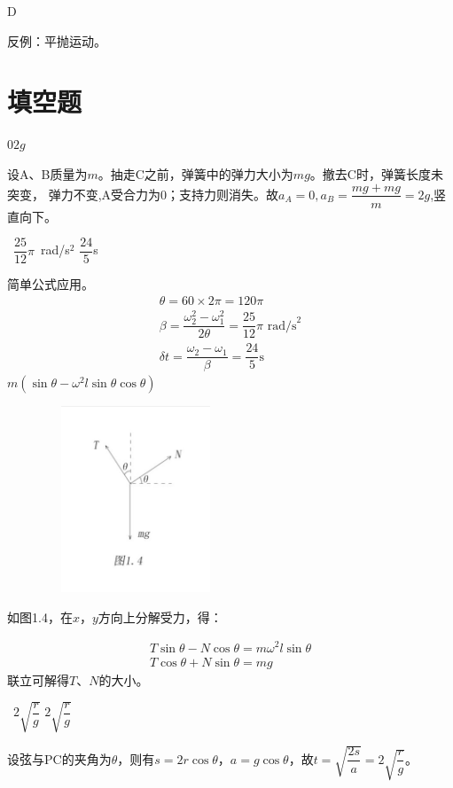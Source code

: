 \documentclass[b5paper,opensource,sourcefont,parskip]{qyxf-book}
\begin{document}
D

\solve 反例：平抛运动。

\section{填空题}
$0$\qquad$2g$

\solve 设A、B质量为$m$。抽走C之前，弹簧中的弹力大小为$mg$。撤去C时，弹簧长度未突变，
弹力不变,A受合力为0；支持力则消失。故$a_A=0,a_B=\dfrac{mg+mg}{m}=2g$,竖直向下。

\ $\dfrac{25}{12}\pi$\ rad/s${}^2$ \qquad$\dfrac{24}{5}$s

\solve 简单公式应用。
\begin{gather*}
\theta=60\times2\pi=120\pi\\
\beta=\dfrac{\omega_2^2-\omega_1^2}{2\theta}=\dfrac{25}{12}\pi\text{\ rad/s}^2\\
\delta t=\dfrac{\omega_2-\omega_1}{\beta}=\dfrac{24}{5}\mathrm{s}
\end{gather*}
$m(\sin\theta-\omega^2l\sin\theta\cos\theta)$

\begin{figure}[!htbp]
	\centering
	\includegraphics[width=15em, height=15em]{Chp1_illus4.png}
	\label{fig:c1}
\end{figure}

\solve 如图1.4，在$x$，$y$方向上分解受力，得：

\begin{gather*}
T\sin\theta-N\cos\theta=m\omega^2l\sin\theta\\
T\cos\theta+N\sin\theta=mg
\end{gather*}
联立可解得$T$、$N$的大小。

\ $2\sqrt{\dfrac{r}{g}}$ \qquad $2\sqrt{\dfrac{r}{g}}$

\solve 设弦与PC的夹角为$\theta$，则有$s=2r\cos\theta$，$a=g\cos\theta$，故$t=\sqrt{\dfrac{2s}{a}}=2\sqrt{\dfrac{r}{g}}$。
\end{document}
